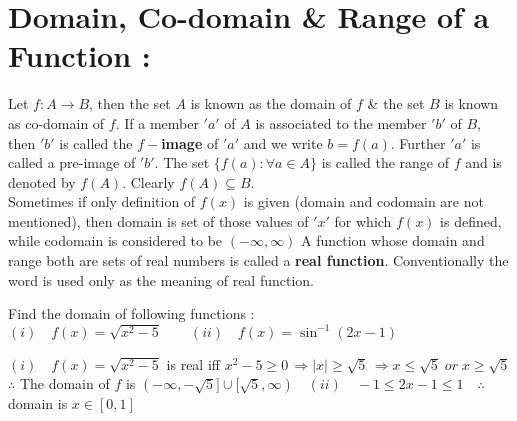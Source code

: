 \documentclass[a4paper,10.5pt,fleqn]{article}
\begin{document}
\begin{soln}
\end{soln}
\section{Domain, Co-domain \& Range of a Function :}
Let $f: A \rightarrow B$, then the set $A$ is known as the domain of $f$ \& the set $B$ is known as co-domain of $f$. If a member $'a'$ of $A$ is associated to the member $'b'$ of $B$, then $'b'$ is called the \textbf{$f-$image} of $'a'$ and we write $b = f (a)$. Further $'a'$ is called a pre-image of $'b'$. The set $\{f(a): \forall a \in A\}$ is called the range of $f$ and is denoted by $f(A)$. Clearly $f(A) \subseteq B$.\\
Sometimes if only definition of $f (x)$ is given (domain and codomain are not mentioned), then domain is set of those values of $'x'$ for which $f (x)$ is defined, while codomain is considered to be $(-\infty, \infty)$
A function whose domain and range both are sets of real numbers is called a \textbf{real function}. Conventionally the word  is used only as the meaning of real function.
\begin{example}
Find the domain of following functions :$(i)\quad f(x)= \sqrt{x^2 -5}\qquad (ii)\quad f(x) = \sin^{-1}(2x-1)$
\end{example}
\begin{soln}

$(i)\quad f(x)= \sqrt{x^2 -5}$ is real iff $x^{2}-5\ge 0\, \Rightarrow |x|\ge \sqrt{5}\,\Rightarrow x\le \sqrt{5}\; or\; x\ge \sqrt{5}$\\ $\therefore$ The domain of $f$ is $(-\infty, -\sqrt{5}]\cup [\sqrt{5},\infty)\quad(ii)\quad  -1 \le 2x-1 \le 1\quad \therefore$ domain is $x \in [0, 1]$
\end{soln}
\end{document}
